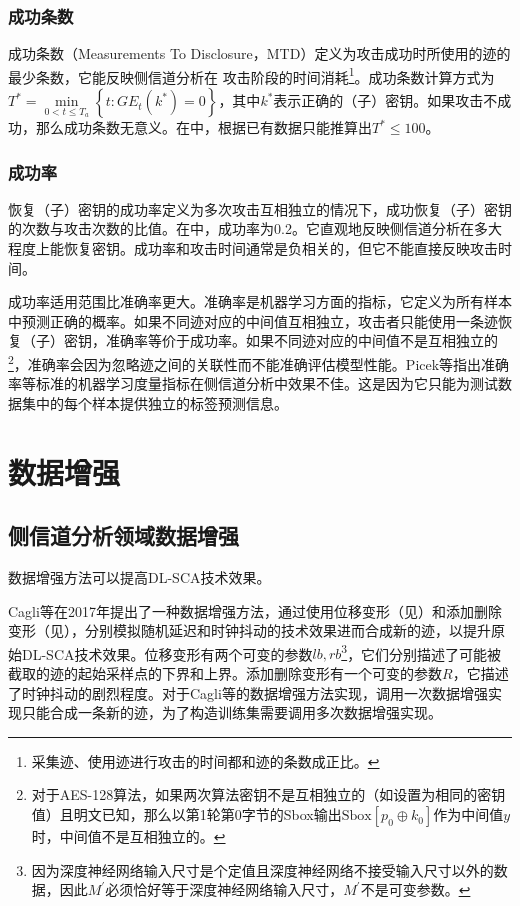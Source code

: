 {	\subsubsection{成功条数}
	成功条数\citep{Kim14}（Measurements To Disclosure，MTD）定义为攻击成功时所使用的迹的最少条数，它能反映侧信道分析在
	攻击阶段的时间消耗\footnote{采集迹、使用迹进行攻击的时间都和迹的条数成正比。}。成功条数计算方式为$T^*=\min\limits_{0<t\le T_a}\left\lbrace t:GE_t(k^*)=0 \right\rbrace $，其中$k^*$表示正确的（子）密钥。如果攻击不成功，那么成功条数无意义。在中，根据已有数据只能推算出$T^*\le100$。
	\subsubsection{成功率}
	恢复（子）密钥的成功率定义为多次攻击互相独立的情况下，成功恢复（子）密钥的次数与攻击次数的比值。在中，成功率为0.2。它直观地反映侧信道分析在多大程度上能恢复密钥。成功率和攻击时间通常是负相关的，但它不能直接反映攻击时间。
	
	成功率适用范围比准确率更大。准确率是机器学习方面的指标，它定义为所有样本中预测正确的概率。如果不同迹对应的中间值互相独立，攻击者只能使用一条迹恢复（子）密钥，准确率等价于成功率。如果不同迹对应的中间值不是互相独立的\footnote{对于AES-128算法，如果两次算法密钥不是互相独立的（如设置为相同的密钥值）且明文已知，那么以第1轮第0字节的Sbox输出$\mathrm{Sbox}[p_0\oplus k_0]$作为中间值$y$时，中间值不是互相独立的。}，准确率会因为忽略迹之间的关联性而不能准确评估模型性能。Picek等\citep{Picek19}指出准确率等标准的机器学习度量指标在侧信道分析中效果不佳。这是因为它只能为测试数据集中的每个样本提供独立的标签预测信息。
	
	
	\section{数据增强}\label{sec:da}
	
	\subsection{侧信道分析领域数据增强}
	数据增强方法可以提高DL-SCA技术效果。
	
	Cagli等\citep{Cagli17}在2017年提出了一种数据增强方法，通过使用位移变形（见）和添加删除变形（见），分别模拟随机延迟和时钟抖动的技术效果进而合成新的迹，以提升原始DL-SCA技术效果。位移变形有两个可变的参数$lb,rb$\footnote{因为深度神经网络输入尺寸是个定值且深度神经网络不接受输入尺寸以外的数据，因此$M^\prime$必须恰好等于深度神经网络输入尺寸，$M^\prime$不是可变参数。}，它们分别描述了可能被截取的迹的起始采样点的下界和上界。添加删除变形有一个可变的参数$R$，它描述了时钟抖动的剧烈程度。对于Cagli等的数据增强方法实现，调用一次数据增强实现只能合成一条新的迹，为了构造训练集需要调用多次数据增强实现。
	
}
